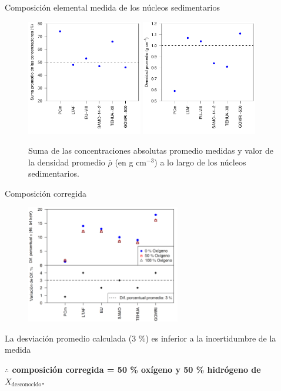 \documentclass[9pt]{beamer}
\begin{document}
\begin{frame}{Composición elemental medida de los núcleos sedimentarios}
	\begin{figure}
	\includegraphics[width = 0.45\textwidth]{Imagenes/Resultados_Composicion.pdf}
	\includegraphics[width = 0.45\textwidth]{Imagenes/Resultados_Densidad.pdf}
	\caption{\justifying Suma de las concentraciones absolutas promedio medidas y valor de la densidad promedio $\overline{\rho}$ (en g cm$^{-3}$) a lo largo de los núcleos sedimentarios.}
	\end{figure}

\end{frame}

\begin{frame}{Composición corregida}
\begin{figure}
\includegraphics[width = 0.6\textwidth]{Imagenes/Resultados_DiffPorcentualEficiencia_FECHP_20190618.png}
\end{figure}

La desviación promedio calculada (3 \%) es inferior a la incertidumbre de la medida 
\begin{center}
\textbf{$\therefore$ composición corregida = 50 \% oxígeno y 50 \% hidrógeno de $X_\text{desconocido}$.}
\end{center}
\end{frame}
\end{document}
